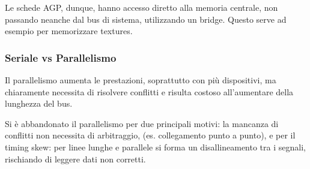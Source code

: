 \documentclass[../template]{subfiles}
\begin{document}
Le schede AGP, dunque, hanno accesso diretto alla memoria centrale, non passando neanche dal bus di sistema, utilizzando un bridge.
Questo serve ad esempio per memorizzare textures.

\subsubsection{Seriale vs Parallelismo}
Il parallelismo aumenta le prestazioni, soprattutto con più dispositivi, ma chiaramente necessita di risolvere conflitti e risulta costoso all'aumentare della lunghezza del bus.

Si è abbandonato il parallelismo per due principali motivi: la mancanza di conflitti non necessita di arbitraggio, (es. collegamento punto a punto), e per il timing skew: per linee lunghe e parallele si forma un disallineamento tra i segnali, rischiando di leggere dati non corretti.
\end{document}
